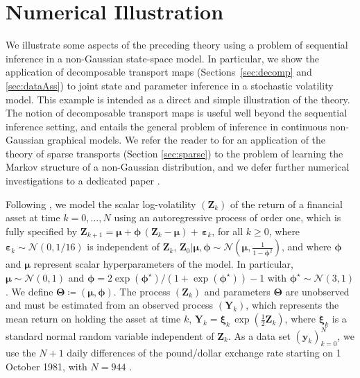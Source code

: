 \documentclass[twoside,11pt]{article}
\newcommand{\Gauss}{\mathcal{N}}                                      %
\newcommand{\Yb}{\boldsymbol{Y}}
\newcommand{\yb}{\boldsymbol{y}}
\newcommand{\Zb}{\boldsymbol{Z}}
\newcommand{\mub}{\boldsymbol{\mu}}
\newcommand{\phib}{\boldsymbol{\phi}}
\newcommand{\vhyp}{\boldsymbol{\Theta}}
\newcommand{\noised}{ \boldsymbol{\varepsilon} }
\newcommand{\noiseo}{ \boldsymbol{\xi} }
\begin{document}
%
%
%

%
%
%
%
%
%

\section{Numerical Illustration}
\label{sec:numerics}
%
%
%
%
We illustrate some aspects of the preceding theory using a problem of
sequential inference in a non-Gaussian state-space model.  In particular,
we show the application of decomposable transport maps
(Sections~\ref{sec:decomp} and \ref{sec:dataAss}) to joint state and
parameter inference in a stochastic volatility model. 
This example is
intended as a direct and simple illustration of the theory.
%
%
%
%
The notion of decomposable transport maps is useful well beyond the sequential
inference setting, and entails the general problem of inference in continuous non-Gaussian graphical 
models.
We refer the reader to \citet{morrison2017beyond} for an application of the theory of
sparse transports (Section \ref{sec:sparse}) to the problem of learning the Markov structure of a 
non-Gaussian distribution, and 
we defer
further numerical investigations to a dedicated paper
\citep{bigoni2016monotone}.
%
%
%
%

%
%
%
%
%
%
%
%
%
%

%
%

Following \citep{kim1998stochastic,rue2009approximate}, we model the scalar log-volatility 
$(\Zb_k)$
of the return of a financial asset at time $k=0,\ldots,N$ using an autoregressive 
process of
order one, which is fully specified by 
$\Zb_{k+1}=\mub + \phib \,(\Zb_k -\mub) + \,\noised_{k}$, for all $k\ge0$,
where $\noised_{k}\sim \Gauss(0,1/16)$ is independent of $\Zb_k$,
$\Zb_0 \vert \mub,\phib \sim 
\Gauss(\mub,\frac{1}{1-\phib^2})$,
and where
%
%
%
%
%
%
%
%
%
$\phib$ and $\mub$ represent scalar
hyperparameters of the model. 
In particular, $\mub\sim\Gauss(0,1)$ and 
$\phib = 2\exp(\phib^\star)/(1+\exp(\phib^\star))-1$ with
$\phib^\star\sim \Gauss(3,1)$.
%
%
%
We define $\vhyp\coloneqq(\mub,\phib)$.
%
The process $(\Zb_k)$ and parameters $\vhyp$ are unobserved and
must be estimated from an observed process $(\Yb_k)$, which represents the
mean return on holding the asset at 
time $k$,  
$\Yb_k = \noiseo_k \, 
\exp(\frac{1}{2}\Zb_k)$, where
$\noiseo_k$ is a standard normal random variable
 independent of $\Zb_k$.
As a data set $(\yb_k)_{k = 0}^N$, we use the $N+1$  daily differences
of the pound/dollar exchange rate starting on 1 October 1981, with
$N=944$
\citep{rue2009approximate,durbin2000time}. 
%
%
\end{document}
